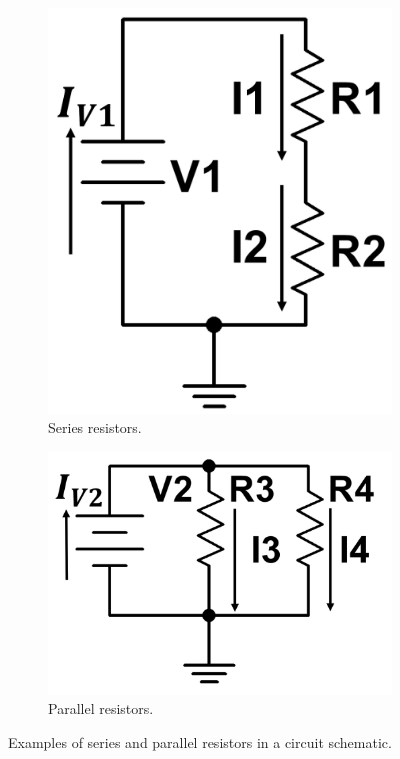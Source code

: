 \documentclass[12pt]{article}
\begin{document}
\begin{figure}[H]
\begin{subfigure}{.5\textwidth}
    \centering
    \includegraphics[width=0.7\linewidth]{photos/lab/series.PNG}
    \caption{Series resistors.}
\end{subfigure}%
\begin{subfigure}{.5\textwidth}
  \centering
  \includegraphics[width=0.8\linewidth]{photos/lab/parallel.PNG}
  \caption{Parallel resistors.}
\end{subfigure}
\caption{Examples of series and parallel resistors in a circuit schematic.}
\end{figure}
\end{document}

